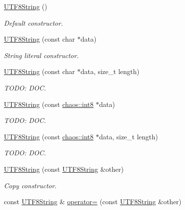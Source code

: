 \begin{DoxyCompactItemize}
\item 
\hyperlink{classchaos_1_1str_1_1_u_t_f8_string_a173513bf2d62d742bee337b00716bf82}{U\+T\+F8\+String} ()
\begin{DoxyCompactList}\small\item\em Default constructor. \end{DoxyCompactList}\item 
\hyperlink{classchaos_1_1str_1_1_u_t_f8_string_af506696bfe777057c4a7e6b6acf19dab}{U\+T\+F8\+String} (const char $\ast$data)
\begin{DoxyCompactList}\small\item\em String literal constructor. \end{DoxyCompactList}\item 
\hyperlink{classchaos_1_1str_1_1_u_t_f8_string_ac3077c0963a5f36dcaa2a87a1c02d05d}{U\+T\+F8\+String} (const char $\ast$data, size\+\_\+t length)
\begin{DoxyCompactList}\small\item\em T\+O\+D\+O\+: D\+O\+C. \end{DoxyCompactList}\item 
\hyperlink{classchaos_1_1str_1_1_u_t_f8_string_a42f9c24b46964187a90d0da58c57949b}{U\+T\+F8\+String} (const \hyperlink{namespacechaos_a56015674cfe4ad1fc583c3da6c724d8a}{chaos\+::int8} $\ast$data)
\begin{DoxyCompactList}\small\item\em T\+O\+D\+O\+: D\+O\+C. \end{DoxyCompactList}\item 
\hyperlink{classchaos_1_1str_1_1_u_t_f8_string_a195c6d579796f70f28ab7f5b4d0e5cb5}{U\+T\+F8\+String} (const \hyperlink{namespacechaos_a56015674cfe4ad1fc583c3da6c724d8a}{chaos\+::int8} $\ast$data, size\+\_\+t length)
\begin{DoxyCompactList}\small\item\em T\+O\+D\+O\+: D\+O\+C. \end{DoxyCompactList}\item 
\hyperlink{classchaos_1_1str_1_1_u_t_f8_string_a194b76859245fdb815ce5d537f2e1db4}{U\+T\+F8\+String} (const \hyperlink{classchaos_1_1str_1_1_u_t_f8_string}{U\+T\+F8\+String} \&other)
\begin{DoxyCompactList}\small\item\em Copy constructor. \end{DoxyCompactList}\item 
const \hyperlink{classchaos_1_1str_1_1_u_t_f8_string}{U\+T\+F8\+String} \& \hyperlink{classchaos_1_1str_1_1_u_t_f8_string_a050b804cc8978a4a55a5bc0a8cad2553}{operator=} (const \hyperlink{classchaos_1_1str_1_1_u_t_f8_string}{U\+T\+F8\+String} \&other)

\end{DoxyCompactItemize}
